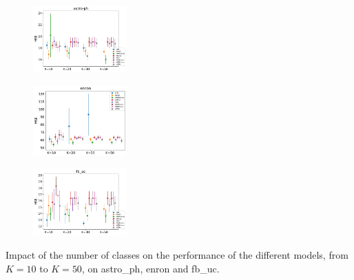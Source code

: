 
\begin{subfigure}
     \centering
         \includegraphics[width=0.32\textwidth]{fig2/astro-ph_wsim3_evo2__}
\end{subfigure}
\begin{subfigure}
         \centering
      \includegraphics[width=0.32\textwidth]{fig2/enron_wsim3_evo2__}   
\end{subfigure}  
\begin{subfigure}
         \centering          
      \includegraphics[width=0.32\textwidth]{fig2/fb_uc_wsim3_evo2__}
\end{subfigure}  
\caption{Impact of the number of classes on the performance of the different models, from $K=10$ to $K=50$, on astro\_ph, enron and fb\_uc.}

